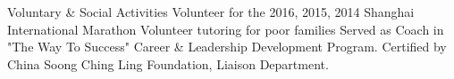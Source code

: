 
\begin{rubric}{Voluntary \& Social Activities}
		Volunteer for the 2016, 2015, 2014 Shanghai International Marathon
		Volunteer tutoring for poor families
		Served as Coach in "The Way To Success" Career \& Leadership Development Program. Certified by China Soong Ching Ling Foundation, Liaison Department.
\end{rubric}

